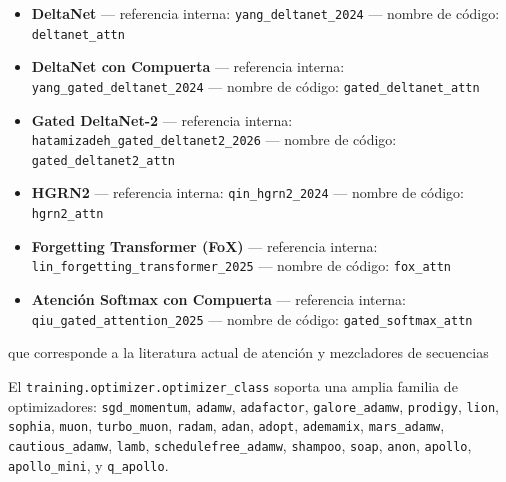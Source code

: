 \begin{itemize}[leftmargin=*]
    \item \textbf{DeltaNet} --- referencia interna: \texttt{yang\_deltanet\_2024} --- nombre de código: \texttt{deltanet\_attn}
    \item \textbf{DeltaNet con Compuerta} --- referencia interna: \texttt{yang\_gated\_deltanet\_2024} --- nombre de código: \texttt{gated\_deltanet\_attn}
    \item \textbf{Gated DeltaNet-2} --- referencia interna: \texttt{hatamizadeh\_gated\_deltanet2\_2026} --- nombre de código: \texttt{gated\_deltanet2\_attn}
    \item \textbf{HGRN2} --- referencia interna: \texttt{qin\_hgrn2\_2024} --- nombre de código: \texttt{hgrn2\_attn}
    \item \textbf{Forgetting Transformer (FoX)} --- referencia interna: \texttt{lin\_forgetting\_transformer\_2025} --- nombre de código: \texttt{fox\_attn}
    \item \textbf{Atención Softmax con Compuerta} --- referencia interna: \texttt{qiu\_gated\_attention\_2025} --- nombre de código: \texttt{gated\_softmax\_attn}
\end{itemize}

que corresponde a la literatura actual de atención y mezcladores de secuencias \citep{sun_retentive_2023,gu_mamba_2023,zhang_continuous_2021,behrouz_titans_2025,ramapuram_theory_2024,vaswani_attention_2017,child_sparse_transformer_2019,beltagy_longformer_2020,zaheer_bigbird_2020,lou_sparsek_2024,yuan_nsa_2025,zhang_spargeattn_2025,wang_fasa_2026,yang_gla_2023,yang_deltanet_2024,yang_gated_deltanet_2024,hatamizadeh_gated_deltanet2_2026,qin_hgrn2_2024,lin_forgetting_transformer_2025,qiu_gated_attention_2025}

El \texttt{training.optimizer.optimizer\_class} soporta una amplia familia de optimizadores:
\texttt{sgd\_momentum}, \texttt{adamw}, \texttt{adafactor}, \texttt{galore\_adamw}, \texttt{prodigy}, \texttt{lion}, \texttt{sophia}, \texttt{muon}, \texttt{turbo\_muon}, \texttt{radam}, \texttt{adan}, \texttt{adopt}, \texttt{ademamix}, \texttt{mars\_adamw}, \texttt{cautious\_adamw}, \texttt{lamb}, \texttt{schedulefree\_adamw}, \texttt{shampoo}, \texttt{soap}, \texttt{anon}, \texttt{apollo}, \texttt{apollo\_mini}, y \texttt{q\_apollo}.

